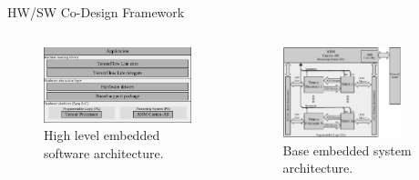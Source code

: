 \begin{frame}{HW/SW Co-Design Framework}
	\begin{columns}[c] %
		
		\begin{column}{0.5\textwidth}
			\begin{figure}
				\includegraphics[width=\textwidth]{../chapters/cnn_accelerator/figures/sw_stack.pdf}
				\caption{\scriptsize High level embedded software architecture.}
			\end{figure}
		\end{column}
		
		\begin{column}{0.5\textwidth}
			\begin{figure}
				\includegraphics[width=0.8\textwidth]{../chapters/cnn_accelerator/figures/system_design.pdf} %
				\caption{\scriptsize Base embedded system architecture.}
			\end{figure}
		\end{column}
		
	\end{columns}
\end{frame}


